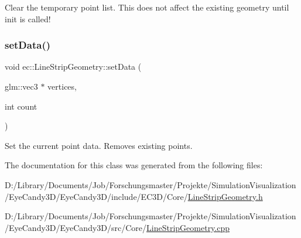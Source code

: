 Clear the temporary point list. This does not affect the existing geometry until init is called! \mbox{\label{classec_1_1_line_strip_geometry_a2649268027055ff190efb0efdc5768a4}} 
\subsubsection{\texorpdfstring{set\+Data()}{setData()}}
{\footnotesize\ttfamily void ec\+::\+Line\+Strip\+Geometry\+::set\+Data (\begin{DoxyParamCaption}\item[{glm\+::vec3 $\ast$}]{vertices,  }\item[{int}]{count }\end{DoxyParamCaption})}

Set the current point data. Removes existing points. 

The documentation for this class was generated from the following files\+:\begin{DoxyCompactItemize}
\item 
D\+:/\+Library/\+Documents/\+Job/\+Forschungsmaster/\+Projekte/\+Simulation\+Visualization/\+Eye\+Candy3\+D/\+Eye\+Candy3\+D/include/\+E\+C3\+D/\+Core/\mbox{\hyperlink{_line_strip_geometry_8h}{Line\+Strip\+Geometry.\+h}}\item 
D\+:/\+Library/\+Documents/\+Job/\+Forschungsmaster/\+Projekte/\+Simulation\+Visualization/\+Eye\+Candy3\+D/\+Eye\+Candy3\+D/src/\+Core/\mbox{\hyperlink{_line_strip_geometry_8cpp}{Line\+Strip\+Geometry.\+cpp}}\end{DoxyCompactItemize}
